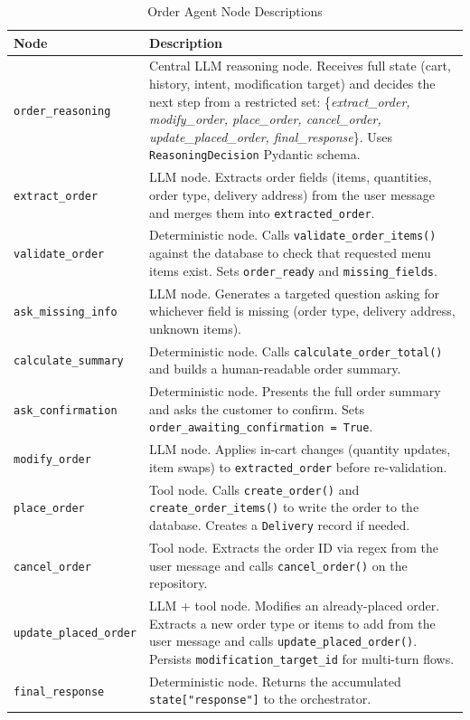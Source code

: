 \documentclass[12pt,a4paper]{report}
\begin{document}
\begin{table}[H]
\centering
\caption{Order Agent Node Descriptions}
\begin{tabularx}{\textwidth}{lX}
\toprule
\textbf{Node} & \textbf{Description} \\
\midrule
\texttt{order\_reasoning}    &
    Central LLM reasoning node. Receives full state (cart, history, intent, modification
    target) and decides the next step from a restricted set:
    \{\textit{extract\_order, modify\_order, place\_order, cancel\_order,
    update\_placed\_order, final\_response}\}.
    Uses \texttt{ReasoningDecision} Pydantic schema. \\[0.4em]
\texttt{extract\_order}      &
    LLM node. Extracts order fields (items, quantities, order type, delivery address)
    from the user message and merges them into \texttt{extracted\_order}. \\[0.4em]
\texttt{validate\_order}     &
    Deterministic node. Calls \texttt{validate\_order\_items()} against the database
    to check that requested menu items exist. Sets \texttt{order\_ready} and
    \texttt{missing\_fields}. \\[0.4em]
\texttt{ask\_missing\_info}  &
    LLM node. Generates a targeted question asking for whichever field is missing
    (order type, delivery address, unknown items). \\[0.4em]
\texttt{calculate\_summary}  &
    Deterministic node. Calls \texttt{calculate\_order\_total()} and builds a
    human-readable order summary. \\[0.4em]
\texttt{ask\_confirmation}   &
    Deterministic node. Presents the full order summary and asks the customer to
    confirm. Sets \texttt{order\_awaiting\_confirmation = True}. \\[0.4em]
\texttt{modify\_order}       &
    LLM node. Applies in-cart changes (quantity updates, item swaps) to
    \texttt{extracted\_order} before re-validation. \\[0.4em]
\texttt{place\_order}        &
    Tool node. Calls \texttt{create\_order()} and \texttt{create\_order\_items()} to
    write the order to the database. Creates a \texttt{Delivery} record if needed. \\[0.4em]
\texttt{cancel\_order}       &
    Tool node. Extracts the order ID via regex from the user message and calls
    \texttt{cancel\_order()} on the repository. \\[0.4em]
\texttt{update\_placed\_order} &
    LLM + tool node. Modifies an already-placed order. Extracts a new order type or
    items to add from the user message and calls \texttt{update\_placed\_order()}.
    Persists \texttt{modification\_target\_id} for multi-turn flows. \\[0.4em]
\texttt{final\_response}     &
    Deterministic node. Returns the accumulated \texttt{state["response"]} to the
    orchestrator. \\
\bottomrule
\end{tabularx}
\end{table}
\end{document}
